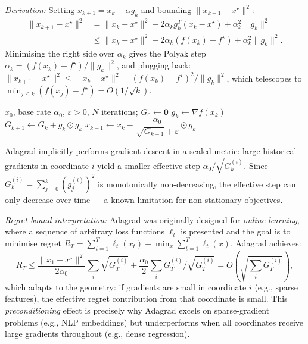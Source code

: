 \documentclass[11pt,a4paper]{article}
\theoremstyle{definition}
\begin{document}
\noindent\textit{Derivation:} Setting $x_{k+1} = x_k - \alpha g_k$ and bounding $\|x_{k+1} - x^{\star}\|^2$:
\begin{align}
\|x_{k+1} - x^{\star}\|^2 &= \|x_k - x^{\star}\|^2 - 2\alpha_k g_k^T(x_k - x^{\star}) + \alpha_k^2 \|g_k\|^2 \nonumber \\
&\leq \|x_k - x^{\star}\|^2 - 2\alpha_k(f(x_k) - f^{\star}) + \alpha_k^2 \|g_k\|^2. \label{eq:polyak_bound}
\end{align}
Minimising the right side over $\alpha_k$ gives the Polyak step $\alpha_k = (f(x_k) - f^{\star})/\|g_k\|^2$, and plugging back:
$\|x_{k+1} - x^{\star}\|^2 \leq \|x_k - x^{\star}\|^2 - (f(x_k) - f^{\star})^2/\|g_k\|^2$, which telescopes to $\min_{j \leq k}(f(x_j) - f^{\star}) = O(1/\sqrt{k})$.

\begin{algorithm}[H]
\caption{Adagrad}
\label{alg:adagrad}
\begin{algorithmic}[1]
\Require $x_0$, base rate $\alpha_0$, $\varepsilon > 0$, $N$ iterations; $G_0 \gets \mathbf{0}$
    \State $g_k \gets \nabla f(x_k)$
    \State $G_{k+1} \gets G_k + g_k \odot g_k$ 
    \State $x_{k+1} \gets x_k - \dfrac{\alpha_0}{\sqrt{G_{k+1}} + \varepsilon} \odot g_k$ 
\EndFor
\end{algorithmic}
\end{algorithm}

Adagrad implicitly performs gradient descent in a scaled metric: large historical gradients in coordinate $i$ yield a smaller effective step $\alpha_0/\sqrt{G_k^{(i)}}$. Since $G_k^{(i)} = \sum_{j=0}^{k} (g_j^{(i)})^2$ is monotonically non-decreasing, the effective step can only decrease over time --- a known limitation for non-stationary objectives.

\noindent\textit{Regret-bound interpretation:} Adagrad was originally designed for \emph{online learning}, where a sequence of arbitrary loss functions $\ell_t$ is presented and the goal is to minimise regret $R_T = \sum_{t=1}^T \ell_t(x_t) - \min_x \sum_{t=1}^T \ell_t(x)$. Adagrad achieves:
\begin{equation}
R_T \leq \frac{\|x_1 - x^{\star}\|^2}{2\alpha_0} \sum_i \sqrt{G_T^{(i)}} + \frac{\alpha_0}{2} \sum_i G_T^{(i)} / \sqrt{G_T^{(i)}} = O\!\left(\sqrt{\sum_i G_T^{(i)}}\right),
\end{equation}
which adapts to the geometry: if gradients are small in coordinate $i$ (e.g., sparse features), the effective regret contribution from that coordinate is small. This \emph{preconditioning} effect is precisely why Adagrad excels on sparse-gradient problems (e.g., NLP embeddings) but underperforms when all coordinates receive large gradients throughout (e.g., dense regression).
\end{document}
